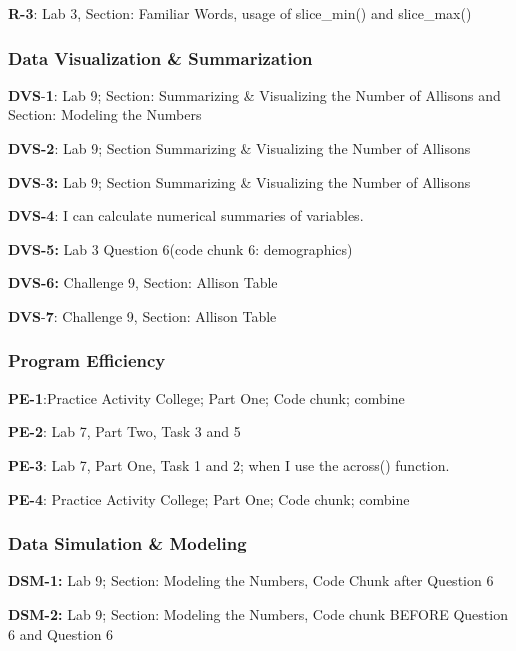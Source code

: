 \documentclass[
  letterpaper,
  DIV=11,
  numbers=noendperiod]{scrartcl}
\begin{document}
\textbf{R-3}: Lab 3, Section: Familiar Words, usage of slice\_min() and
slice\_max()

\hypertarget{data-visualization-summarization}{%
\subsubsection{Data Visualization \&
Summarization}\label{data-visualization-summarization}}

\textbf{DVS}-\textbf{1}: Lab 9; Section: Summarizing \& Visualizing the
Number of Allisons and Section: Modeling the Numbers

\textbf{DVS-2}: Lab 9; Section Summarizing \& Visualizing the Number of
Allisons

\textbf{DVS}-\textbf{3:} Lab 9; Section Summarizing \& Visualizing the
Number of Allisons

\textbf{DVS-4}: I can calculate numerical summaries of variables.

\textbf{DVS-5:} Lab 3 Question 6(code chunk 6: demographics)

\textbf{DVS-6:} Challenge 9, Section: Allison Table

\textbf{DVS}-\textbf{7}: Challenge 9, Section: Allison Table

\hypertarget{program-efficiency}{%
\subsubsection{Program Efficiency}\label{program-efficiency}}

\textbf{PE-1}:Practice Activity College; Part One; Code chunk; combine

\textbf{PE-2}: Lab 7, Part Two, Task 3 and 5

\textbf{PE-3}: Lab 7, Part One, Task 1 and 2; when I use the across()
function.

\textbf{PE-4}: Practice Activity College; Part One; Code chunk; combine

\hypertarget{data-simulation-modeling}{%
\subsubsection{Data Simulation \&
Modeling}\label{data-simulation-modeling}}

\textbf{DSM-1:} Lab 9; Section: Modeling the Numbers, Code Chunk after
Question 6

\textbf{DSM-2:} Lab 9; Section: Modeling the Numbers, Code chunk BEFORE
Question 6 and Question 6
\end{document}
